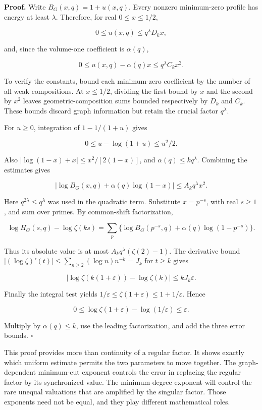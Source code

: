 \documentclass[
  11pt,
  a4paper,
]{report}
\begin{document}
\textbf{Proof.} Write \(B_G(x,q)=1+u(x,q)\). Every nonzero minimum-zero
profile has energy at least \(\lambda\). Therefore, for real
\(0\le x\le1/2\),

\[
 0\le u(x,q)\le q^\lambda D_kx,
\]

and, since the volume-one coefficient is \(\alpha(q)\),

\[
 0\le u(x,q)-\alpha(q)x\le q^\lambda C_kx^2.
\]

To verify the constants, bound each minimum-zero coefficient by the
number of all weak compositions. At \(x\le1/2\), dividing the first
bound by \(x\) and the second by \(x^2\) leaves geometric-composition
sums bounded respectively by \(D_k\) and \(C_k\). These bounds discard
graph information but retain the crucial factor \(q^\lambda\).

For \(u\ge0\), integration of \(1-1/(1+u)\) gives

\[
 0\le u-\log(1+u)\le u^2/2.
\]

Also \(|\log(1-x)+x|\le x^2/[2(1-x)]\), and \(\alpha(q)\le kq^\lambda\).
Combining the estimates gives

\[
 |\log B_G(x,q)+\alpha(q)\log(1-x)|
 \le A_kq^\lambda x^2.
 \tag{8.4}
\]

Here \(q^{2\lambda}\le q^\lambda\) was used in the quadratic term.
Substitute \(x=p^{-s}\), with real \(s\ge1\), and sum over primes. By
common-shift factorization,

\[
 \log H_G(s,q)-\log\zeta(ks)
 =\sum_p\{\log B_G(p^{-s},q)+\alpha(q)\log(1-p^{-s})\}.
\]

Thus its absolute value is at most \(A_kq^\lambda(\zeta(2)-1)\). The
derivative bound \(|(\log\zeta)'(t)|\le\sum_{n\ge2}(\log n)n^{-k}=J_k\)
for \(t\ge k\) gives

\[
 |\log\zeta(k(1+\varepsilon))-\log\zeta(k)|\le kJ_k\varepsilon.
\]

Finally the integral test yields
\(1/\varepsilon\le\zeta(1+\varepsilon)\le1+1/\varepsilon\). Hence

\[
 0\le\log\zeta(1+\varepsilon)-\log(1/\varepsilon)
 \le\varepsilon.
\]

Multiply by \(\alpha(q)\le k\), use the leading factorization, and add
the three error bounds. \(\square\)

This proof provides more than continuity of a regular factor. It shows
exactly which uniform estimate permits the two parameters to move
together. The graph-dependent minimum-cut exponent controls the error in
replacing the regular factor by its synchronized value. The
minimum-degree exponent will control the rare unequal valuations that
are amplified by the singular factor. Those exponents need not be equal,
and they play different mathematical roles.
\end{document}
